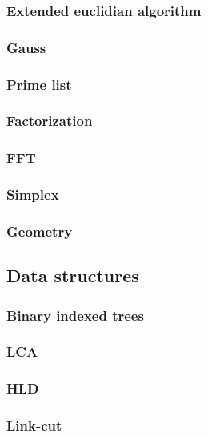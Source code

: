 \documentclass[landscape,a4paper,twocolumn,10pt]{report}
\begin{document}
\subsubsection*{Extended euclidian algorithm}

\subsubsection*{Gauss}

\subsubsection*{Prime list}

\subsubsection*{Factorization}

\subsubsection*{FFT}

\subsubsection*{Simplex}

\subsubsection*{Geometry}


\newpage
\subsection*{Data structures}
\subsubsection*{Binary indexed trees}

\subsubsection*{LCA}

\subsubsection*{HLD}

\subsubsection*{Link-cut}

\end{document}
